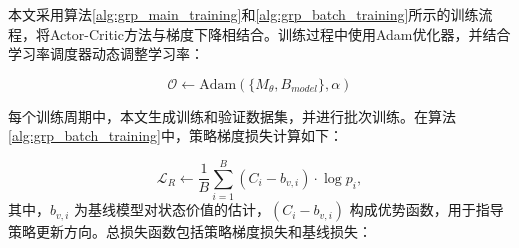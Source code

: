 \documentclass[AutoFakeBold]{LZUThesis}
\begin{document}





本文采用算法\ref{alg:grp_main_training}和\ref{alg:grp_batch_training}所示的训练流程，将Actor-Critic方法与梯度下降相结合。训练过程中使用Adam优化器，并结合学习率调度器动态调整学习率：

\begin{equation}
	\mathcal{O} \leftarrow \text{Adam}(\{M_{\theta}, B_{model}\}, \alpha)
\end{equation}

每个训练周期中，本文生成训练和验证数据集，并进行批次训练。在算法\ref{alg:grp_batch_training}中，策略梯度损失计算如下：

\begin{equation}
	\mathcal{L}_{R} \leftarrow \frac{1}{B}\sum_{i=1}^{B}(C_i - b_{v,i}) \cdot \log p_i,
\end{equation}
其中，$b_{v,i}$ 为基线模型对状态价值的估计，$(C_i - b_{v,i})$ 构成优势函数，用于指导策略更新方向。总损失函数包括策略梯度损失和基线损失：
\end{document}
